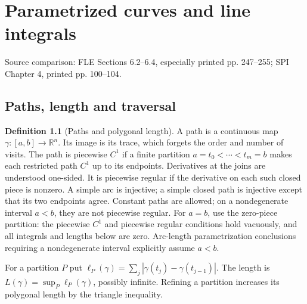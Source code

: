 \documentclass[11pt,oneside,openany]{book}
\theoremstyle{definition}
\newtheorem{definition}[theorem]{Definition}
\theoremstyle{remark}
\newcommand{\R}{\mathbb R}
\newcommand{\family}[1]{}
\newcommand{\source}[1]{\par\begingroup\small\sffamily\color{black!65}Source comparison: #1\par\endgroup}
\begin{document}


\chapter{Parametrized curves and line integrals}
\label{ch:d04-09}
\source{FLE Sections 6.2--6.4, especially printed pp. 247--255; SPI Chapter 4, printed pp. 100--104.}

\section{Paths, length and traversal}
\family{K04.09.01}\family{K04.09.02}\family{K04.09.03}
\begin{definition}[Paths and polygonal length]\label{d04:09:paths}
A path is a continuous map $\gamma:[a,b]\to\R^n$. Its image is its
trace, which forgets the order and number of visits. The path is piecewise
$C^1$ if a finite partition $a=t_0<\cdots<t_m=b$ makes each restricted
path $C^1$ up to its endpoints. Derivatives at the joins are understood
one-sided. It is piecewise regular if the derivative on each such closed
piece is nonzero. A simple arc is injective; a simple closed path is
injective except that its two endpoints agree. Constant paths are allowed; on a nondegenerate interval $a<b$, they are not piecewise regular.
For $a=b$, use the zero-piece partition: the piecewise $C^1$ and piecewise regular conditions hold vacuously, and all integrals and lengths below are zero.
Arc-length parametrization conclusions requiring a nondegenerate interval explicitly assume $a<b$.

For a partition $P$ put
$\ell_P(\gamma)=\sum_j|\gamma(t_j)-\gamma(t_{j-1})|$.
The length is $L(\gamma)=\sup_P\ell_P(\gamma)$, possibly infinite.
Refining a partition increases its polygonal length by the triangle inequality.
\end{definition}
\end{document}
